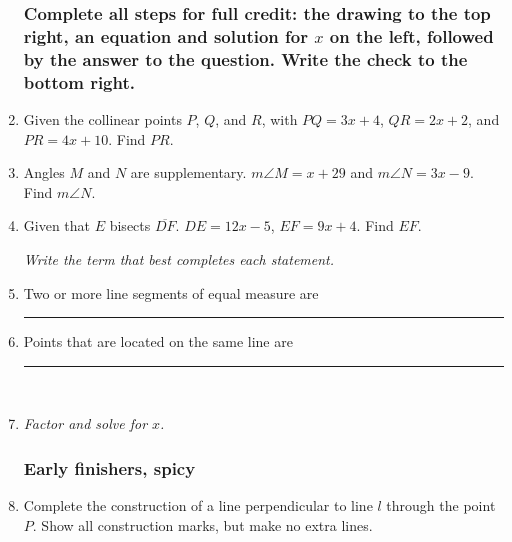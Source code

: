 \documentclass[12pt, twoside]{article}
\begin{document}
\begin{enumerate}
\newpage
\subsubsection*{Complete all steps for full credit: the drawing to the top right, an equation and solution for $x$ on the left, followed by the answer to the question. Write the check to the bottom right.}

\item Given the collinear points $P$, $Q$, and $R$, with $PQ=3x+4$, $QR=2x+2$, and $PR=4x+10$. Find ${PR}$.
  \vspace{9cm}

\item Angles $M$ and $N$ are supplementary. $m\angle M = x+29$ and $m\angle N = 3x-9$. Find $m\angle N$. \vspace{7cm}


\newpage

\item Given that $E$ bisects $\overline{DF}$. $DE=12x-5$, $EF=9x+4$. Find ${EF}$.
  \vspace{9cm}

  \emph{Write the term that best completes each statement.}
\item Two or more line segments of equal measure are \rule{4cm}{0.15mm} \bigskip

\item Points that are located on the same line are \rule{4cm}{0.15mm} \\[15pt]

\item \emph{Factor and solve for $x$.}
  \begin{enumerate}
  \end{enumerate}
  
\newpage
\subsubsection*{Early finishers, spicy}

\item Complete the construction of a line perpendicular to line $l$ through the point $P$. Show all construction marks, but make no extra lines. \vspace{2cm}
  \begin{center}
  \end{center} \vspace{6cm}


\end{enumerate}
\end{document}

